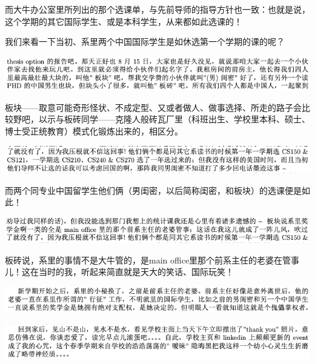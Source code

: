 \documentclass[9pt, b5paper]{article}
\begin{document}
而大牛办公室里所列出的那个选课单，与先前导师的指导方针也一致：也就是说，这个学期的其它国际学生、或是本科学生，从来都如此选课的！

我们来看一下当初、系里两个中国国际学生是如休选第一个学期的课的呢？

\begin{center}
\includegraphics[width=.9\linewidth]{./pic/backups_plans_20210424_114632.png}
\end{center}

板块——取意可能奇形怪状、不成定型、又或者做人、做事选择、所走的路子会比较野吧，以示与板砖同学——克隆人般砖瓦厂里（科班出生、学校里本科、硕士、博士受正统教育）模式化锻炼出来的，相区分。

\begin{center}
\includegraphics[width=.9\linewidth]{./pic/backups_plans_20210424_114938.png}
\end{center}

而两个同专业中国留学生他们俩（男闺密，以后简称闺密，和板块）的选课便是如此！

\begin{center}
\includegraphics[width=.9\linewidth]{./pic/backups_plans_20210424_114917.png}
\end{center}

板砖说，系里的事情不是大牛管的，是main office里那个前系主任的老婆在管事儿！这在当时的我，听起来简直就是天大的笑话、国际玩笑！

\begin{center}
\includegraphics[width=.9\linewidth]{./pic/backups_plans_20210424_155833.png}
\end{center}


\begin{center}
\includegraphics[width=.9\linewidth]{./pic/backups_plans_20210424_121459.png}
\end{center}
\end{document}
